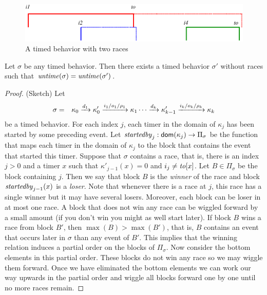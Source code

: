 \begin{figure}[h]
\vspace{-1em}
\begin{center}
\includegraphics[width=.45\textwidth]{wiggling.pdf}
\end{center}
\caption{A timed behavior with two races}
\label{fig:races}
\end{figure}

\begin{lemma}
\label{race elimination}
Let $\sigma$ be any timed behavior.
Then there exists a timed behavior $\sigma'$ without races such that $\mathit{untime}(\sigma)=\mathit{untime}(\sigma')$.
\end{lemma}
\iflong
\begin{proof}
(Sketch) Let
\begin{eqnarray*}
\sigma & = & \kappa_0 \xrightarrow{d_1} \kappa'_0 \xrightarrow{i_1/o_1/\rho_1} \kappa_1 \cdots
\xrightarrow{d_k} \kappa'_{k-1} \xrightarrow{i_k/o_k/\rho_k} \kappa_{k}
\end{eqnarray*}
be a timed behavior.
%
For each index $j$, each timer in the domain of $\kappa_j$ has been started by some preceding event.
Let $\mathit{startedby}_j : {\textsf{dom}}(\kappa_j) \rightarrow \Pi_\sigma$ be the function that maps each timer in
the domain of $\kappa_j$ to the block that contains the event that started this timer.
Suppose that $\sigma$ contains a race, that is, there is an index $j>0$ and a timer $x$  
such that $\kappa'_{j-1}(x) = 0$ and $i_j \neq \mathit{to}[x]$.
Let $B \in \Pi_\sigma$ be the block containing $j$. Then we say that block $B$ is the \emph{winner} of the race and block
$\mathit{startedby}_{j-1}(x)$ is a \emph{loser}.
Note that whenever there is a race at $j$, this race has a single winner but it may have several losers.
Moreover, each block can be loser in at most one race.
A block that does not win any race can be wiggled forward by a small amount (if you don't win you might as well start later).
If block $B$ wins a race from block $B'$, then $\max(B)>\max(B')$, that is, $B$ contains an event that occurs later
in $\sigma$ than any event of $B'$.
This implies that the winning relation induces a partial order on the blocks of $\Pi_\sigma$.
Now consider the bottom elements in this partial order. These blocks do not win any race so we may wiggle them forward.
Once we have eliminated the bottom elements we can work our way upwards in the partial order and wiggle all blocks
forward one by one until no more races remain.
\end{proof}
\fi

